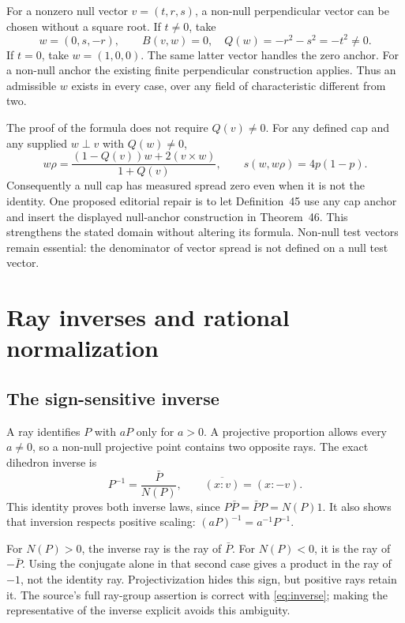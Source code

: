 \documentclass[11pt]{article}
\theoremstyle{remark}
\begin{document}
For a nonzero null vector \(v=(t,r,s)\), a non-null perpendicular vector
can be chosen without a square root. If \(t\ne0\), take
\[
 w=(0,s,-r),\qquad B(v,w)=0,\quad Q(w)=-r^2-s^2=-t^2\ne0.
\]
If \(t=0\), take \(w=(1,0,0)\). The same latter vector handles the zero
anchor. For a non-null anchor the existing finite perpendicular construction
applies. Thus an admissible \(w\) exists in every case, over any field of
characteristic different from two.

The proof of the formula does not require \(Q(v)\ne0\). For any defined cap
and any supplied \(w\perp v\) with \(Q(w)\ne0\),
\[
 w\rho=\frac{(1-Q(v))w+2(v\times w)}{1+Q(v)},\qquad
 s(w,w\rho)=4p(1-p).
\]
Consequently a null cap has measured spread zero even when it is not the
identity. One proposed editorial repair is to let Definition~45 use any cap
anchor and insert the displayed null-anchor construction in Theorem~46.
This strengthens the stated domain without altering its formula. Non-null
test vectors remain essential: the denominator of vector spread is not
defined on a null test vector.

\section{Ray inverses and rational normalization}

\subsection{The sign-sensitive inverse}

A ray identifies \(P\) with \(aP\) only for \(a>0\). A projective
proportion allows every \(a\ne0\), so a non-null projective point contains
two opposite rays. The exact dihedron inverse is
\begin{equation}
 P^{-1}=\frac{\bar P}{N(P)},\qquad \overline{(x:v)}=(x:-v).
 \label{eq:inverse}
\end{equation}
This identity proves both inverse laws, since
\(P\bar P=\bar PP=N(P)1\). It also shows that inversion respects positive
scaling: \((aP)^{-1}=a^{-1}P^{-1}\).

For \(N(P)>0\), the inverse ray is the ray of \(\bar P\). For
\(N(P)<0\), it is the ray of \(-\bar P\). Using the conjugate alone in
that second case gives a product in the ray of \(-1\), not the identity
ray. Projectivization hides this sign, but positive rays retain it. The
source's full ray-group assertion is correct with \eqref{eq:inverse};
making the representative of the inverse explicit avoids this ambiguity.
\end{document}
